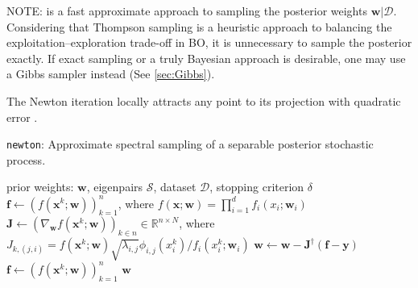 \documentclass{article}
\begin{document}
NOTE:  is a fast approximate approach to sampling the posterior
weights $\mathbf{w} | \mathcal{D}$. Considering that Thompson sampling
is a heuristic approach to balancing the exploitation--exploration
trade-off in BO, it is unnecessary to sample the posterior exactly. If
exact sampling or a truly Bayesian approach is desirable, one may use a
Gibbs sampler instead (See \cref{sec:Gibbs}).

The Newton iteration locally attracts any point to its
projection with quadratic error \cite{Gatilov2014}.

\begin{algorithm}[h]
  \caption{\texttt{newton}: Approximate spectral sampling
    of a separable posterior stochastic process.}
  \label{alg:newton}
  \begin{algorithmic}[1] %
    \Input prior weights: $\mathbf{w}$, eigenpairs $\mathcal{S}$,
    dataset $\mathcal{D}$, stopping criterion $\delta$
    \State $\mathbf{f} \gets (f(\mathbf{x}^k; \mathbf{w}))_{k=1}^n$, where
    $f(\mathbf{x}; \mathbf{w}) = \prod_{i=1}^d f_i(x_i; \mathbf{w}_i)$
      \State $\mathbf{J} \gets (\nabla_{\mathbf{w}} f(\mathbf{x}^k; \mathbf{w}))_{k \in n}
      \in \mathbb{R}^{n \times N}$, where $J_{k,(j,i)} =
      {f(\mathbf{x}^k; \mathbf{w})} \sqrt{\lambda_{i,j}} \phi_{i,j}(x_i^k) / {f_i(x_i^k; \mathbf{w}_i)}$
      \State $\mathbf{w} \gets \mathbf{w} - \mathbf{J}^\dagger (\mathbf{f} - \mathbf{y})$
      \State $\mathbf{f} \gets (f(\mathbf{x}^k; \mathbf{w}))_{k=1}^n$
    \EndWhile
    \Output $\mathbf{w}$
  \end{algorithmic}
\end{algorithm}
\end{document}
